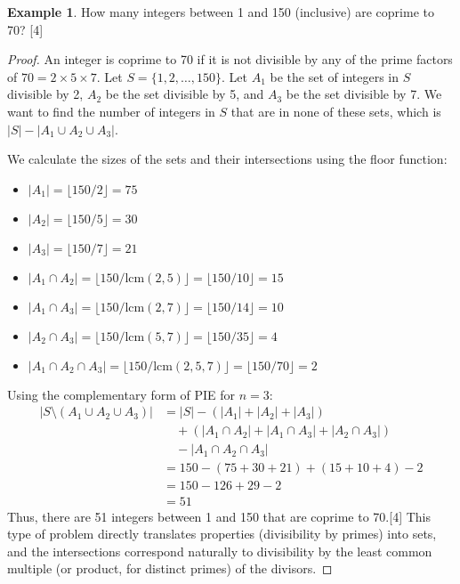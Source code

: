 \documentclass[11pt]{amsart}
\theoremstyle{plain}
\theoremstyle{definition}
\newtheorem{example}[theorem]{Example}
\theoremstyle{remark}
\begin{document}
\begin{example}
How many integers between 1 and 150 (inclusive) are coprime to 70? [4]
\end{example}
\begin{proof}
An integer is coprime to 70 if it is not divisible by any of the prime factors of $70 = 2 \times 5 \times 7$. Let $S = \{1, 2, \ldots, 150\}$. Let $A_1$ be the set of integers in $S$ divisible by 2, $A_2$ be the set divisible by 5, and $A_3$ be the set divisible by 7. We want to find the number of integers in $S$ that are in none of these sets, which is $|S| - |A_1 \cup A_2 \cup A_3|$.

We calculate the sizes of the sets and their intersections using the floor function:
\begin{itemize}
    \item $|A_1| = \lfloor 150 / 2 \rfloor = 75$
    \item $|A_2| = \lfloor 150 / 5 \rfloor = 30$
    \item $|A_3| = \lfloor 150 / 7 \rfloor = 21$
    \item $|A_1 \cap A_2| = \lfloor 150 / \text{lcm}(2,5) \rfloor = \lfloor 150 / 10 \rfloor = 15$
    \item $|A_1 \cap A_3| = \lfloor 150 / \text{lcm}(2,7) \rfloor = \lfloor 150 / 14 \rfloor = 10$
    \item $|A_2 \cap A_3| = \lfloor 150 / \text{lcm}(5,7) \rfloor = \lfloor 150 / 35 \rfloor = 4$
    \item $|A_1 \cap A_2 \cap A_3| = \lfloor 150 / \text{lcm}(2,5,7) \rfloor = \lfloor 150 / 70 \rfloor = 2$
\end{itemize}
Using the complementary form of PIE for $n=3$:
\begin{align*}
|S \setminus (A_1 \cup A_2 \cup A_3)| &= |S| - (|A_1| + |A_2| + |A_3|) \\
&\quad + (|A_1 \cap A_2| + |A_1 \cap A_3| + |A_2 \cap A_3|) \\
&\quad - |A_1 \cap A_2 \cap A_3| \\
&= 150 - (75 + 30 + 21) + (15 + 10 + 4) - 2 \\
&= 150 - 126 + 29 - 2 \\
&= 51
\end{align*}
Thus, there are 51 integers between 1 and 150 that are coprime to 70.[4] This type of problem directly translates properties (divisibility by primes) into sets, and the intersections correspond naturally to divisibility by the least common multiple (or product, for distinct primes) of the divisors.
\end{proof}
\end{document}
